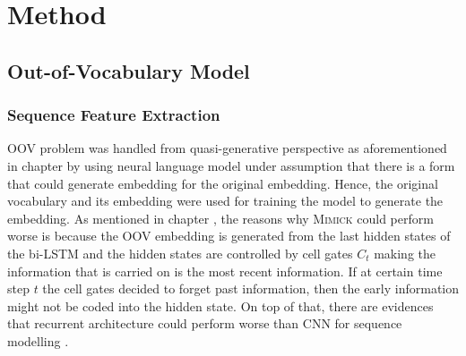 \chapter{Method}
\label{chap:method}

\section{Out-of-Vocabulary Model}
    \subsection{Sequence Feature Extraction}
        OOV problem was handled from quasi-generative perspective as
        aforementioned in chapter  by using neural
        language model under assumption that there is a form that
        could generate embedding for the original embedding. Hence,
        the original vocabulary and its embedding were used for
        training the model to generate the embedding. As mentioned in
        chapter , the reasons why \textsc{Mimick}
        could perform worse is because the OOV embedding is generated
        from the last hidden states of the bi-LSTM and the hidden
        states are controlled by cell gates $C_t$ making the
        information that is carried on is the most recent information.
        If at certain time step $t$ the cell gates decided to forget
        past information, then the early information might not be
        coded into the hidden state. On top of that, there are
        evidences that recurrent architecture could perform worse than
        CNN for sequence modelling \citep{empirical2018shaujie}. 
        
